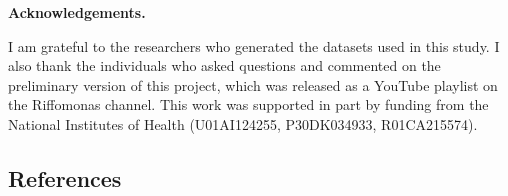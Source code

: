 \documentclass[
]{article}
\begin{document}
\vspace{10mm}

\textbf{Acknowledgements.}

I am grateful to the researchers who generated the datasets used in this
study. I also thank the individuals who asked questions and commented on
the preliminary version of this project, which was released as a YouTube
playlist on the Riffomonas channel. This work was supported in part by
funding from the National Institutes of Health (U01AI124255,
P30DK034933, R01CA215574).

\newpage

\hypertarget{references}{%
\subsection{References}\label{references}}

\setlength{\parindent}{-0.25in}
\setlength{\leftskip}{0.25in}

\noindent
\end{document}
